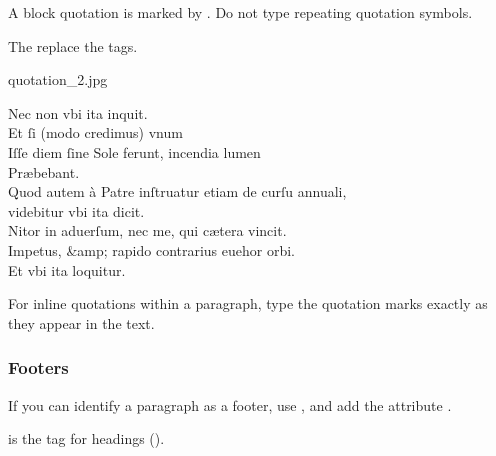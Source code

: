 \begin{mainrule}
A block quotation is marked by . Do not type repeating quotation symbols.
\end{mainrule}

\begin{clarification}
The  replace the  tags.
\end{clarification}

\begin{sampleImage}{quotation_2.jpg}
\begin{typeLatin}
Nec non vbi ita inquit.\\
Et ſi (modo credimus) vnum \\
Iſſe diem ſine Sole ferunt, incendia lumen \\
Præbebant.\\
Quod autem à Patre inſtruatur etiam de curſu annuali, \\
videbitur vbi ita dicit.\\
Nitor in aduerſum, nec me, qui cætera vincit. \\
Impetus, &amp; rapido contrarius euehor orbi. \\
Et vbi ita loquitur.
\end{typeLatin}
\end{sampleImage}

\begin{note}
For inline quotations within a paragraph, type the quotation marks exactly as they appear in the text.
\end{note}

\subsubsection{Footers}
\label{footers}

\begin{mainruleLessImportant}
If you can identify a paragraph as a footer, use , and add the attribute .
\end{mainruleLessImportant}

\begin{crossref}
 is the tag for headings ().
\end{crossref}

